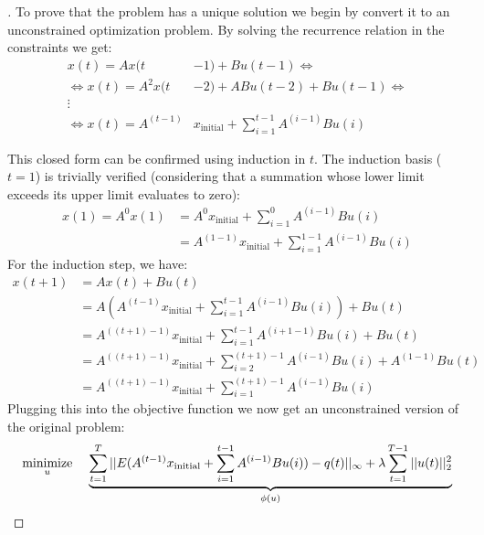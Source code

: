 \documentclass[12pt]{article}
\DeclareMathOperator*{\minimize}{minimize}
\begin{document}
\begin{proof}[\unskip\nopunct]
To prove that the problem has a unique solution we begin by convert it to an unconstrained optimization problem. By solving the recurrence relation in the constraints we get:
\vspace{-0.1em}
\begin{align*}
    x(t)= Ax(t&-1) + Bu(t-1)
    \Leftrightarrow
    \\
    \Leftrightarrow
    x(t)= A^2x(t&-2) + ABu(t-2) + Bu(t-1)
    \Leftrightarrow
    \\
    \vdots
    \\
    \Leftrightarrow 
    x(t)= A^{(t-1)} & x_{\text{initial}} + \sum_{i=1}^{t-1} A^{(i-1)}Bu(i)
\end{align*}

This closed form can be confirmed using induction in $t$. The induction basis ($t = 1$) is trivially verified (considering that a summation whose lower limit exceeds its upper limit evaluates to zero):
\vspace{-0.8em}
\begin{align*}
    x(1) = A^0 x(1) &= A^0 x_{\text{initial}} +  \sum_{i=1}^{0} A^{(i-1)}Bu(i) \\
    &= A^{(1 - 1)} x_{\text{initial}} +  \sum_{i=1}^{1 - 1} A^{(i-1)}Bu(i)
\end{align*}
\vspace{-0.5em}
For the induction step, we have:
\begin{align*}
    x(t + 1) &= Ax(t) + Bu(t) \\
    &= A \left(  A^{(t-1)} x_{\text{initial}} + \sum_{i=1}^{t-1} A^{(i-1)}Bu(i) \right) + Bu(t) \\ 
    &=  A^{((t + 1)-1)} x_{\text{initial}} + \sum_{i=1}^{t-1} A^{(i + 1 -1)}Bu(i) + Bu(t) \\ 
    &= A^{((t + 1)-1)} x_{\text{initial}} + \sum_{i=2}^{(t + 1)-1} A^{(i-1)}Bu(i) + A^{(1 - 1)}Bu(t) \\ 
    &= A^{((t + 1)-1)} x_{\text{initial}} + \sum_{i=1}^{(t + 1)-1} A^{(i-1)}Bu(i)
\end{align*}
Plugging this into the objective function we now get an unconstrained version of the original problem:
\vspace{-0.5em}
\begin{align*}
    \minimize_{u} \hspace{0.4cm} \underbrace{
    \sum_{t=1}^{T} ||E (A^{(t-1)} x_{\text{initial}} + \sum_{i=1}^{t-1} A^{(i-1)} B u(i)) - q(t)||_{\infty} +
    \lambda \sum_{t=1}^{T-1} ||u(t)||_{2}^2}_{\phi(u)}
\end{align*}


\end{proof}
\end{document}
